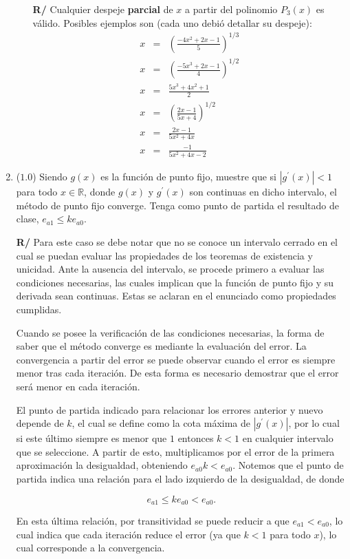 \documentclass[12pt]{article}
\newcommand{\R}{\ensuremath{\mathbb{R}}}
\begin{document}
\begin{enumerate}[leftmargin=*,widest=9]
\begin{enumerate}[label=\alph*]
\textbf{R/} Cualquier despeje \textbf{parcial} de \(x\) a partir del polinomio \(P_3(x)\) es válido. Posibles ejemplos son (cada uno debió detallar su despeje):
\begin{eqnarray}
x & = & \left(\frac{-4x^2 + 2x - 1}{5} \right)^{1/3} \\
x & = & \left(\frac{-5x^3 + 2x - 1}{4} \right)^{1/2} \\
x & = & \frac{5x^3 + 4x^2 + 1}{2} \\
x & = & \left(\frac{2x-1}{5x+4} \right)^{1/2} \\
x & = & \frac{2x-1}{5x^2+4x} \\
x & = & \frac{-1}{5x^2 + 4x -2}
\end{eqnarray}

\end{enumerate}


   \item (\(1.0\)) Siendo \(g(x)\) es la función de punto fijo, muestre que si \(|g^\prime(x)|<1\) para todo \(x \in \R\), donde \(g(x)\) y \(g^\prime(x)\) son continuas en dicho intervalo, el método de punto fijo converge. Tenga como punto de partida el resultado de clase, \(e_{a1} \leq k e_{a0}\).

\textbf{R/} Para este caso se debe notar que no se conoce un intervalo cerrado en el cual se puedan evaluar las propiedades de los teoremas de existencia y unicidad. Ante la ausencia del intervalo, se procede primero a evaluar las condiciones necesarias, las cuales implican que la función de punto fijo y su derivada sean continuas. Estas se aclaran en el enunciado como propiedades cumplidas.

Cuando se posee la verificación de las condiciones necesarias, la forma de saber que el método converge es mediante la evaluación del error. La convergencia a partir del error se puede observar cuando el error es siempre menor tras cada iteración. De esta forma es necesario demostrar que el error será menor en cada iteración.

El punto de partida indicado para relacionar los errores anterior y nuevo depende de \(k\), el cual se define como la cota máxima de \(|g^{\prime}(x)|\), por lo cual si este último siempre es menor que \(1\) entonces \(k<1\) en cualquier intervalo que se seleccione. A partir de esto, multiplicamos por el error de la primera aproximación la desigualdad, obteniendo \(e_{a0}k < e_{a0}\). Notemos que el punto de partida indica una relación para el lado izquierdo de la desigualdad, de donde

\[ e_{a1} \leq ke_{a0} < e_{a0}.\]

En esta última relación, por transitividad se puede reducir a que \(e_{a1}<e_{a0}\), lo cual indica que cada iteración reduce el error (ya que \(k<1\) para todo \(x\)), lo cual corresponde a la convergencia.


\end{enumerate}
\end{document}
